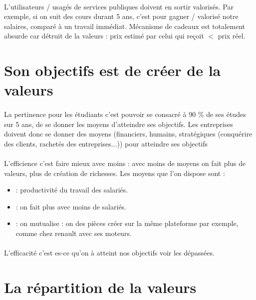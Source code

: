 \paragraph{} L'utilisateurs / usagés de services publiques doivent en sortir valorisés. Par exemple, si on suit des cours durant 5 ans, c'est pour gagner / valorisé notre salaires, comparé à un travail immédiat. Mécanisme de cadeaux est totalement absurde car détruit de la valeurs : prix estimé par celui qui reçoit $<$ prix réel.

\section{Son objectifs est de créer de la valeurs}

\paragraph{} La pertinence pour les étudiants c'est pouvoir se consacré à 90 \% de ses études sur 5 ans, de se donner les moyens d'atteindre ses objectifs. Les entreprises doivent donc se donner des moyens (financiers, humains, stratégiques (conquérire des clients, rachetés des entreprises...)) pour atteindre ses objectifs
\paragraph{} L'efficience c'est faire mieux avec moins : avec moins de moyens on fait plus de valeurs, plus de création de richesses. Les moyens que l'on dispose sont : 
\begin{itemize}
	\item : productivité du travail des salariés.
	\item : on fait plus avec moins de salariés.
	\item : on mutualise : on des pièces créer sur la même plateforme par exemple, comme chez renault avec ses moteurs.
\end{itemize}
\paragraph{} L'efficacité c'est es-ce qu'on à atteint nos objectifs voir les dépassées.

\section{La répartition de la valeurs}

